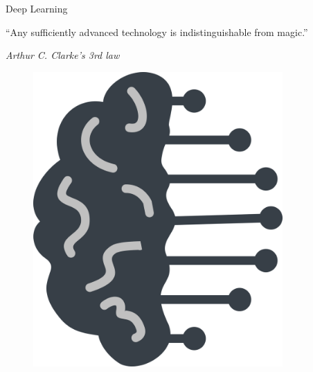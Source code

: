 \documentclass[11pt,compress,t,notes=noshow, xcolor=table]{beamer}
\begin{document}
\begin{vbframe}{Deep Learning}
{\begin{small}
    ``Any sufficiently advanced technology is indistinguishable from magic.''
    \begin{footnotesize}
      \emph{Arthur C. Clarke's 3rd law}
    \end{footnotesize}
  \end{small}
  }
  {
  \begin{center}
    \vspace{4em}
    \begin{figure}
      \includegraphics[width=0.85\textwidth]{figure_man/deep-learning.png} 
    \end{figure}
  \end{center}
  }
\end{vbframe}

\end{document}
